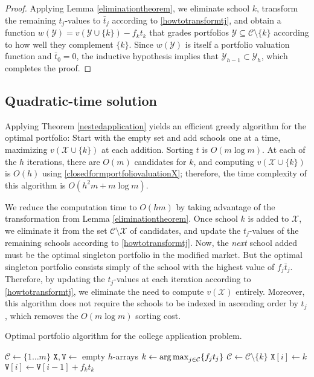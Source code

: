 \begin{proof}
Applying Lemma \ref{eliminationtheorem}, we eliminate school $k$, transform the remaining $t_j$-values to $\bar t_j$ according to \eqref{howtotransformtj}, and obtain a function $w(\mathcal{Y}) = v(\mathcal{Y} \cup \{k\}) - f_k t_k$ that grades portfolios $\mathcal{Y} \subseteq \mathcal{C} \setminus \{k\}$ according to how well they complement $\{k\}$. Since $w(\mathcal{Y})$ is itself a portfolio valuation function and $\bar t_0 = 0$, the inductive hypothesis implies that $\mathcal{Y}_{h-1} \subset \mathcal{Y}_h$, which completes the proof.
\end{proof}




\subsection{Quadratic-time solution} \label{sectionQuadTimeSoln}

Applying Theorem \ref{nestedapplication} yields an efficient greedy algorithm for the optimal portfolio: Start with the empty set and add schools one at a time, maximizing $v(\mathcal{X}\cup \{k\})$ at each addition. Sorting $t$ is  $O(m \log m)$.  At each of the $h$ iterations, there are $O(m)$ candidates for $k$, and computing $v(\mathcal{X}\cup \{k\})$ is $O(h)$ using \eqref{closedformportfoliovaluationX}; therefore, the time complexity of this algorithm is $O(h^2 m + m \log m)$. 

We reduce the computation time to $O(hm)$ by taking advantage of the transformation from Lemma \ref{eliminationtheorem}. Once school $k$ is added to $\mathcal{X}$, we eliminate it from the set $\mathcal{C}\setminus \mathcal{X}$ of candidates, and update the $t_j$-values of the remaining schools according to \eqref{howtotransformtj}. Now, the \emph{next} school added must be the optimal singleton portfolio in the modified market. But the optimal singleton portfolio consists simply of the school with the highest value of $f_j \bar t_j$. Therefore, by updating the $t_j$-values at each iteration according to \eqref{howtotransformtj}, we eliminate the need to compute $v(\mathcal{X})$ entirely. Moreover, this algorithm does not require the schools to be indexed in ascending order by $t_j$, which removes the $O(m\log m)$ sorting cost.

\begin{algorithm}[h] 
\caption{Optimal portfolio algorithm for the college application problem.} \label{algorithmforlargeh}
\KwIn{Utility values $t \in(0, \infty)^m$, admissions probabilities $f \in (0, 1]^m$, application limit $h \leq m$.}
$\mathcal{C} \gets \{1 \dots m\}$\;
$\mathtt{X, V} \gets $ empty $h$-arrays\;
{
    $k \gets \operatorname*{arg\,max}_{j \in \mathcal{C}}\{f_j t_j\}$\;
    $\mathcal{C} \gets \mathcal{C} \setminus \{k\}$\;
    $\mathtt{X}[i] \gets k$\;
     {$\mathtt{V}[i] \gets \mathtt{V}[i-1] + f_k t_k$}
	{
	}
}
\end{algorithm}



